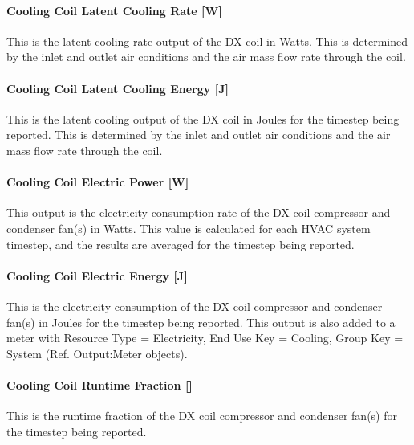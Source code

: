 \paragraph{Cooling Coil Latent Cooling Rate {[}W{]}}\label{cooling-coil-latent-cooling-rate-w-2}

This is the latent cooling rate output of the DX coil in Watts. This is determined by the inlet and outlet air conditions and the air mass flow rate through the coil.

\paragraph{Cooling Coil Latent Cooling Energy {[}J{]}}\label{cooling-coil-latent-cooling-energy-j-2}

This is the latent cooling output of the DX coil in Joules for the timestep being reported. This is determined by the inlet and outlet air conditions and the air mass flow rate through the coil.

\paragraph{Cooling Coil Electric Power {[}W{]}}\label{cooling-coil-electric-power-w}

This output is the electricity consumption rate of the DX coil compressor and condenser fan(s) in Watts. This value is calculated for each HVAC system timestep, and the results are averaged for the timestep being reported.

\paragraph{Cooling Coil Electric Energy {[}J{]}}\label{cooling-coil-electric-energy-j}

This is the electricity consumption of the DX coil compressor and condenser fan(s) in Joules for the timestep being reported. This output is also added to a meter with Resource Type = Electricity, End Use Key = Cooling, Group Key = System (Ref. Output:Meter objects).

\paragraph{Cooling Coil Runtime Fraction {[]}}\label{cooling-coil-runtime-fraction-2}

This is the runtime fraction of the DX coil compressor and condenser fan(s) for the timestep being reported.

